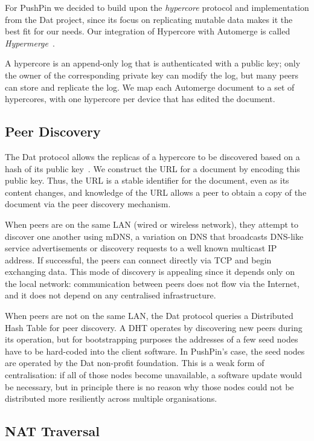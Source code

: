 \documentclass[sigplan,10pt]{acmart}
\begin{document}
For PushPin we decided to build upon the \emph{hypercore} protocol and implementation from the Dat project, since its focus on replicating mutable data makes it the best fit for our needs.
Our integration of Hypercore with Automerge is called \emph{Hypermerge}~\cite{Hypermerge}.

A hypercore is an append-only log that is authenticated with a public key; only the owner of the corresponding private key can modify the log, but many peers can store and replicate the log. We map each Automerge document to a set of hypercores, with one hypercore per device that has edited the document.

\subsection{Peer Discovery}\label{sec:peer-discovery}

The Dat protocol allows the replicas of a hypercore to be discovered based on a hash of its public key~\cite{HowDatWorks}.
We construct the URL for a document by encoding this public key.
Thus, the URL is a stable identifier for the document, even as its content changes, and knowledge of the URL allows a peer to obtain a copy of the document via the peer discovery mechanism.

When peers are on the same LAN (wired or wireless network), they attempt to discover one another using mDNS, a variation on DNS that broadcasts DNS-like service advertisements or discovery requests to a well known multicast IP address.
If successful, the peers can connect directly via TCP and begin exchanging data.
This mode of discovery is appealing since it depends only on the local network: communication between peers does not flow via the Internet, and it does not depend on any centralised infrastructure.

When peers are not on the same LAN, the Dat protocol queries a Distributed Hash Table for peer discovery. A DHT operates by discovering new peers during its operation, but for bootstrapping purposes the addresses of a few seed nodes have to be hard-coded into the client software. In PushPin's case, the seed nodes are operated by the Dat non-profit foundation. This is a weak form of centralisation: if all of those nodes become unavailable, a software update would be necessary, but in principle there is no reason why those nodes could not be distributed more resiliently across multiple organisations. 

\subsection{NAT Traversal}\label{sec:nat-traversal}
\end{document}
